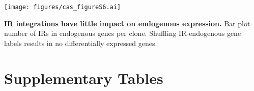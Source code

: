 \begin{suppfigure}[htbp]  
    \centering
    \texttt{[image: figures/cas\_figureS6.ai]}
    \caption[IR integrations have little impact on endogenous expression.]{
        \textbf{IR integrations have little impact on endogenous expression.}
        Bar plot number of IRs in endogenous genes per clone.
        Shuffling IR-endogenous gene labels results in no differentially expressed genes.   
    }
    \label{fig:cas_figureS6}
\end{suppfigure}

\clearpage

\section{Supplementary Tables}

